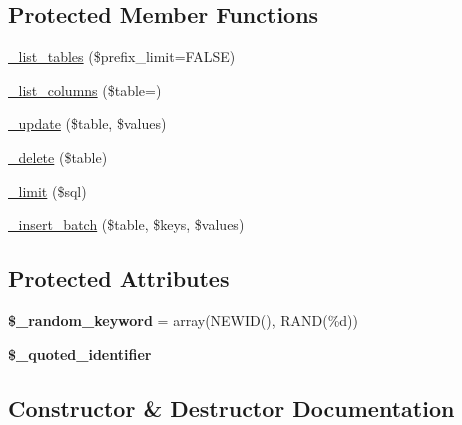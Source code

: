 \subsection*{Protected Member Functions}
\begin{DoxyCompactItemize}
\item 
\mbox{\hyperlink{class_c_i___d_b__pdo__sqlsrv__driver_a003ef9a5739ce86fdb32df81e01e4402}{\+\_\+list\+\_\+tables}} (\$prefix\+\_\+limit=F\+A\+L\+SE)
\item 
\mbox{\hyperlink{class_c_i___d_b__pdo__sqlsrv__driver_ae3cf2d3b9c7e6c4e2984ca5239e365bd}{\+\_\+list\+\_\+columns}} (\$table=\textquotesingle{}\textquotesingle{})
\item 
\mbox{\hyperlink{class_c_i___d_b__pdo__sqlsrv__driver_aca531f2923affae4e66056e7298b92e1}{\+\_\+update}} (\$table, \$values)
\item 
\mbox{\hyperlink{class_c_i___d_b__pdo__sqlsrv__driver_a64b0bb018323b24fae99f0e3bdf054bc}{\+\_\+delete}} (\$table)
\item 
\mbox{\hyperlink{class_c_i___d_b__pdo__sqlsrv__driver_a5b84bc34e2f14dacb104af461285f13f}{\+\_\+limit}} (\$sql)
\item 
\mbox{\hyperlink{class_c_i___d_b__pdo__sqlsrv__driver_a0d2a256e1314da50ecfd51815e6054c2}{\+\_\+insert\+\_\+batch}} (\$table, \$keys, \$values)
\end{DoxyCompactItemize}
\subsection*{Protected Attributes}
\begin{DoxyCompactItemize}
\item 
\mbox{\label{class_c_i___d_b__pdo__sqlsrv__driver_ac27607065d60937ea4109ea87003561e}} 
{\bfseries \$\+\_\+random\+\_\+keyword} = array(\textquotesingle{}N\+E\+W\+ID()\textquotesingle{}, \textquotesingle{}R\+A\+ND(\%d)\textquotesingle{})
\item 
\mbox{\label{class_c_i___d_b__pdo__sqlsrv__driver_a989eb0335b2acef03115bbcb0eb62959}} 
{\bfseries \$\+\_\+quoted\+\_\+identifier}
\end{DoxyCompactItemize}


\subsection{Constructor \& Destructor Documentation}
\mbox{\label{class_c_i___d_b__pdo__sqlsrv__driver_aee97df012bfb3a41c47d3951a515ef5d}} 
